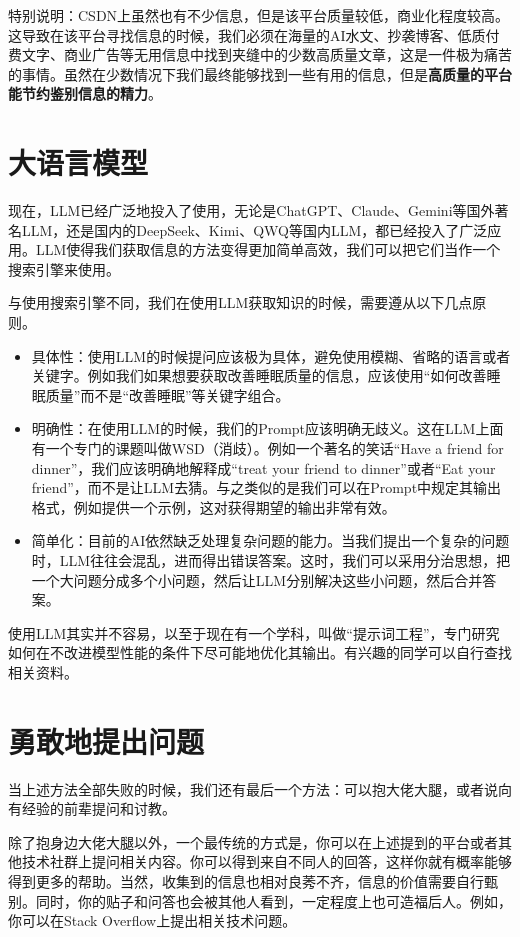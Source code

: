 \documentclass[12pt]{report}
\begin{document}
特别说明：CSDN上虽然也有不少信息，但是该平台质量较低，商业化程度较高。这导致在该平台寻找信息的时候，我们必须在海量的AI水文、抄袭博客、低质付费文字、商业广告等无用信息中找到夹缝中的少数高质量文章，这是一件极为痛苦的事情。虽然在少数情况下我们最终能够找到一些有用的信息，但是\textbf{高质量的平台能节约鉴别信息的精力}。

\section{大语言模型}

现在，LLM已经广泛地投入了使用，无论是ChatGPT、Claude、Gemini等国外著名LLM，还是国内的DeepSeek、Kimi、QWQ等国内LLM，都已经投入了广泛应用。LLM使得我们获取信息的方法变得更加简单高效，我们可以把它们当作一个搜索引擎来使用。

与使用搜索引擎不同，我们在使用LLM获取知识的时候，需要遵从以下几点原则。

\begin{itemize}
    \item 具体性：使用LLM的时候提问应该极为具体，避免使用模糊、省略的语言或者关键字。例如我们如果想要获取改善睡眠质量的信息，应该使用“如何改善睡眠质量”而不是“改善睡眠”等关键字组合。
    \item 明确性：在使用LLM的时候，我们的Prompt应该明确无歧义。这在LLM上面有一个专门的课题叫做WSD（消歧）。例如一个著名的笑话“Have a friend for dinner”，我们应该明确地解释成“treat your friend to dinner”或者“Eat your friend”，而不是让LLM去猜。与之类似的是我们可以在Prompt中规定其输出格式，例如提供一个示例，这对获得期望的输出非常有效。
    \item 简单化：目前的AI依然缺乏处理复杂问题的能力。当我们提出一个复杂的问题时，LLM往往会混乱，进而得出错误答案。这时，我们可以采用分治思想，把一个大问题分成多个小问题，然后让LLM分别解决这些小问题，然后合并答案。
\end{itemize}

使用LLM其实并不容易，以至于现在有一个学科，叫做“提示词工程”，专门研究如何在不改进模型性能的条件下尽可能地优化其输出。有兴趣的同学可以自行查找相关资料。

\section{勇敢地提出问题}

当上述方法全部失败的时候，我们还有最后一个方法：可以抱大佬大腿，或者说向有经验的前辈提问和讨教。

除了抱身边大佬大腿以外，一个最传统的方式是，你可以在上述提到的平台或者其他技术社群上提问相关内容。你可以得到来自不同人的回答，这样你就有概率能够得到更多的帮助。当然，收集到的信息也相对良莠不齐，信息的价值需要自行甄别。同时，你的贴子和问答也会被其他人看到，一定程度上也可造福后人。例如，你可以在Stack Overflow上提出相关技术问题。
\end{document}
